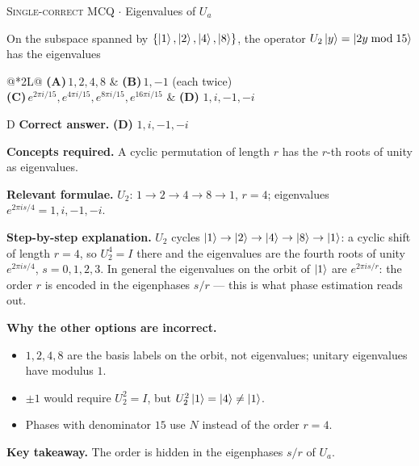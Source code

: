 \documentclass[11pt,a4paper]{article}
\newcommand{\optlabel}[1]{\textbf{(#1)}}
\newcommand{\correctlabel}[1]{\textcolor{okgreen}{\textbf{(#1)}\,\ding{51}}}
\newenvironment{qitem}[1]{\begin{list}{}{\setlength{\leftmargin}{3.3em}\setlength{\labelwidth}{3.1em}%
  \setlength{\labelsep}{0.2em}\setlength{\topsep}{3pt}\setlength{\parsep}{3pt}}\item[\textbf{Q.#1}\hfill]}{\end{list}}
\newcommand{\qsep}{\par\vspace{2pt}{\color{black!15}\hrule}\vspace{4pt}}
\newcommand{\qmeta}[2]{{\footnotesize\color{black!60}\textsc{#1} \;$\cdot$\; #2}\par}
\begin{document}
\begin{qitem}{24}
\qmeta{Single-correct MCQ}{Eigenvalues of $U_a$}
On the subspace spanned by $\{\ket1, \ket2, \ket4, \ket8\}$, the operator $U_2\ket y = \ket{2y \bmod 15}$ has the eigenvalues
\par\smallskip\noindent\begin{tabularx}{\linewidth}{@{}*{2}{L}@{}}
\optlabel{A}\,$1, 2, 4, 8$ & \optlabel{B}\,$1, -1$ (each twice) \\[3pt]
\optlabel{C}\,$e^{2\pi i/15}, e^{4\pi i/15}, e^{8\pi i/15}, e^{16\pi i/15}$ & \correctlabel{D}\,$1, i, -1, -i$
\end{tabularx}
\end{qitem}
\begin{solbox}{D}
\textbf{\color{brand}Correct answer.} \textcolor{okgreen}{\textbf{(D)}} $1, i, -1, -i$

\textbf{\color{brand}Concepts required.} A cyclic permutation of length $r$ has the $r$-th roots of unity as eigenvalues.

\textbf{\color{brand}Relevant formulae.} $U_2$: $1 \to 2 \to 4 \to 8 \to 1$, $r = 4$; eigenvalues $e^{2\pi is/4} = 1, i, -1, -i$.

\textbf{\color{brand}Step-by-step explanation.} $U_2$ cycles $\ket1 \to \ket2 \to \ket4 \to \ket8 \to \ket1$: a cyclic shift of length $r = 4$, so $U_2^4 = I$ there and the eigenvalues are the fourth
roots of unity $e^{2\pi is/4}$, $s = 0, 1, 2, 3$. In general the eigenvalues on the orbit of $\ket1$ are $e^{2\pi is/r}$: the order $r$ is encoded in the
eigenphases $s/r$ --- this is what phase estimation reads out.

\textbf{\color{brand}Why the other options are incorrect.}
\begin{itemize}[leftmargin=2.4em, itemsep=1pt, topsep=2pt]
\item[\textbf{(A)}] $1, 2, 4, 8$ are the basis labels on the orbit, not eigenvalues; unitary eigenvalues have modulus $1$.
\item[\textbf{(B)}] $\pm1$ would require $U_2^2 = I$, but $U_2^2\ket1 = \ket4 \ne \ket1$.
\item[\textbf{(C)}] Phases with denominator $15$ use $N$ instead of the order $r = 4$.
\end{itemize}
\textbf{\color{brand}Key takeaway.} The order is hidden in the eigenphases $s/r$ of $U_a$.
\end{solbox}
\qsep
\end{document}

